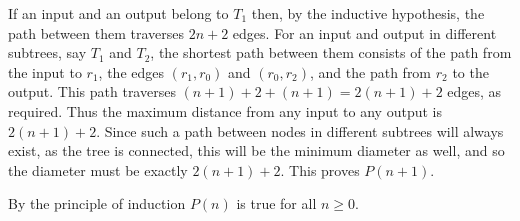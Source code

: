 \documentclass[twoside,12pt]{article}
\begin{document}
\begin{problem}[10 points]
{If an input and an output belong to $T_1$ then, by the inductive
hypothesis, the path between them traverses $2n + 2$ edges. For an
input and output in different subtrees, say $T_1$ and $T_2$, the
shortest path between them consists of the path from the input to
$r_1$, the edges $(r_1,r_0)$ and $(r_0,r_2)$, and the path from
$r_2$ to the output. This path traverses $(n + 1) + 2 + (n + 1) =
2(n + 1) + 2$ edges, as required. Thus the maximum distance from any
input to any output is $2(n+1) + 2$. Since such a path between nodes
in different subtrees will always exist, as the tree is connected,
this will be the minimum diameter as well, and so the diameter must
be exactly $2(n+1) + 2$. This proves $P(n+1)$.

By the principle of induction $P(n)$ is true for all $n \geq 0$.}
\eparts
\end{problem}

\end{document}
